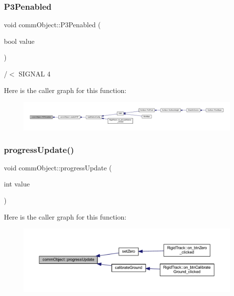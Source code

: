 \subsubsection{\texorpdfstring{P3\+Penabled}{P3Penabled}}
{\footnotesize\ttfamily void comm\+Object\+::\+P3\+Penabled (\begin{DoxyParamCaption}\item[{bool}]{value }\end{DoxyParamCaption})\hspace{0.3cm}{\ttfamily [signal]}}



/$<$ S\+I\+G\+N\+AL 4 

Here is the caller graph for this function\+:\nopagebreak
\begin{figure}[H]
\begin{center}
\leavevmode
\includegraphics[width=350pt]{classcomm_object_af369de87a7f2c9b7170223bedd6c08d9_icgraph}
\end{center}
\end{figure}
\mbox{\label{classcomm_object_acfc97f4310e2b7d841ecb8cf8be0088e}} 
\subsubsection{\texorpdfstring{progress\+Update()}{progressUpdate()}}
{\footnotesize\ttfamily void comm\+Object\+::progress\+Update (\begin{DoxyParamCaption}\item[{int}]{value }\end{DoxyParamCaption})}

Here is the caller graph for this function\+:\nopagebreak
\begin{figure}[H]
\begin{center}
\leavevmode
\includegraphics[width=350pt]{classcomm_object_acfc97f4310e2b7d841ecb8cf8be0088e_icgraph}
\end{center}
\end{figure}
\mbox{\label{classcomm_object_a6039d306f25a6b46c78942edf9cee662}} 
